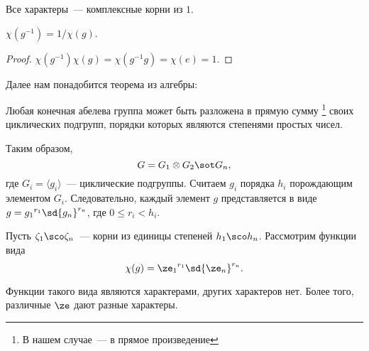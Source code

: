 	\begin{imp}
	Все характеры~— комплексные корни из $1$.
	\end{imp}

 $\chi(g^{-1}) = 1 / \chi(g)$.

	\begin{proof}
	$\chi(g^{-1})\chi(g)=\chi(g^{-1}g)=\chi(e)=1$.
	\end{proof}

Далее нам понадобится теорема из алгебры:

\begin{theorem}
Любая конечная абелева группа может быть разложена в прямую сумму
\footnote{В нашем случае~— в прямое произведение} своих циклических подгрупп, 
порядки которых являются степенями простых чисел.
\end{theorem}

Таким образом, $$G = G_1 \otimes G_2 \sot G_n,$$
где $G_i=\langle g_i\rangle$~— циклические подгруппы. 
Считаем $g_i$ порядка $h_i$ порождающим элементом $G_i$. Следовательно, каждый 
элемент $g$ представляется в виде $g = {g_1}^{r_1} \sd {g_n}^{r_n}$, 
где $0 \le r_i < h_i$.

Пусть $\zeta_1 \sco \zeta_n$~— корни из единицы степеней $h_1 \sco h_n$. 
Рассмотрим функции вида $$\chi(g) = {\ze_1}^{r_1} \sd {\ze_n}^{r_n}.$$

  Функции такого вида являются характерами, других характеров нет. Более того, 
	различные $\ze$ дают разные характеры.

